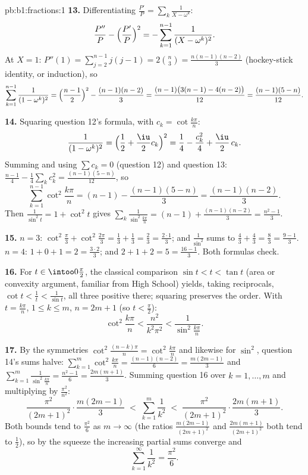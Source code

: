 \begin{solution}{pb:b1:fractions:1}
\textbf{13.} Differentiating $\frac{P'}P = \sum_k\frac1{X -
\omega^k}$:
\[
\frac{P''}P - \Bigl(\frac{P'}P\Bigr)^2
= -\sum_{k=1}^{n-1}\frac1{(X - \omega^k)^2} .
\]
At $X = 1$: $P''(1) = \sum_{j=2}^{n-1}j(j-1) = 2\binom n3 =
\frac{n(n-1)(n-2)}3$ (hockey-stick identity, or induction), so
\[
\sum_{k=1}^{n-1}\frac1{(1 - \omega^k)^2}
= \Bigl(\frac{n-1}2\Bigr)^2 - \frac{(n-1)(n-2)}3
= \frac{(n-1)\bigl(3(n-1) - 4(n-2)\bigr)}{12}
= \frac{(n-1)(5-n)}{12} .
\]

\textbf{14.} Squaring question 12's formula, with $c_k =
\cot\frac{k\pi}n$:
\[
\frac1{(1-\omega^k)^2}
= \Bigl(\frac12 + \frac\iu2 c_k\Bigr)^2
= \frac14 - \frac{c_k^2}4 + \frac\iu2\,c_k .
\]
Summing and using $\sum c_k = 0$ (question 12) and question 13:
$\frac{n-1}4 - \frac14\sum_k c_k^2 = \frac{(n-1)(5-n)}{12}$, so
\[
\sum_{k=1}^{n-1}\cot^2\frac{k\pi}n
= (n-1) - \frac{(n-1)(5-n)}3 = \frac{(n-1)(n-2)}3 .
\]
Then $\frac1{\sin^2t} = 1 + \cot^2t$ gives
$\sum_k\frac1{\sin^2\frac{k\pi}n} = (n-1) +
\frac{(n-1)(n-2)}3 = \frac{n^2-1}3$.

\textbf{15.} $n = 3$: $\cot^2\frac\pi3 + \cot^2\frac{2\pi}3 =
\frac13 + \frac13 = \frac23 = \frac{2\cdot1}3$; and
$\frac1{\sin^2} $ sums to $\frac43 + \frac43 = \frac83 =
\frac{9-1}3$. $n = 4$: $1 + 0 + 1 = 2 = \frac{3\cdot2}3$; and $2
+ 1 + 2 = 5 = \frac{16-1}3$. Both formulas check.

\textbf{16.} For $t \in \intoo0{\frac\pi2}$, the classical
comparison $\sin t < t < \tan t$ (area or convexity argument,
familiar from High School) yields, taking reciprocals, $\cot t <
\frac1t < \frac1{\sin t}$, all three positive there; squaring
preserves the order. With $t = \frac{k\pi}n$, $1 \leq k \leq m$,
$n = 2m+1$ (so $t < \frac\pi2$):
\[
\cot^2\frac{k\pi}n < \frac{n^2}{k^2\pi^2} <
\frac1{\sin^2\frac{k\pi}n} .
\]

\textbf{17.} By the symmetries $\cot^2\frac{(n-k)\pi}n =
\cot^2\frac{k\pi}n$ and likewise for $\sin^2$, question 14's sums
halve: $\sum_{k=1}^{m}\cot^2\frac{k\pi}n = \frac{(n-1)(n-2)}6 =
\frac{m(2m-1)}3$ and $\sum_{k=1}^m\frac1{\sin^2\frac{k\pi}n} =
\frac{n^2-1}6 = \frac{2m(m+1)}3$. Summing question 16 over $k =
1, \dots, m$ and multiplying by $\frac{\pi^2}{n^2}$:
\[
\frac{\pi^2}{(2m+1)^2}\cdot\frac{m(2m-1)}3
\;<\; \sum_{k=1}^{m}\frac1{k^2} \;<\;
\frac{\pi^2}{(2m+1)^2}\cdot\frac{2m(m+1)}3 .
\]
Both bounds tend to $\frac{\pi^2}6$ as $m \to \infty$ (the ratios
$\frac{m(2m-1)}{(2m+1)^2}$ and $\frac{2m(m+1)}{(2m+1)^2}$ both
tend to $\frac12$), so by the squeeze the increasing partial sums
converge and
\[
\sum_{k=1}^{\infty}\frac1{k^2} = \frac{\pi^2}6 .
\]


\end{solution}

